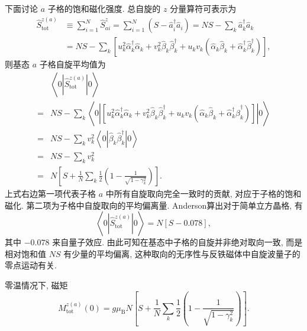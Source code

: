 下面讨论 $a$ 子格的饱和磁化强度. 总自旋的 $z$ 分量算符可表示为
\begin{align}
\hat{S}_\mathrm{tot}^{z(a)} & \equiv \sum_{i=1}^{N} \hat{S}_{a i}^{z}=\sum_{i=1}^{N}\left(S-\hat a_{i}^{\dagger} \hat a^{}_{i}\right)=N S-\sum_{k} \hat a_{k}^{\dagger} \hat a^{}_{k}\nonumber \\
&=NS-\sum_{k}\left[u_{k}^{2} \hat \alpha_{k}^{\dagger} \hat \alpha^{}_{k}+v_{k}^{2} \hat \beta^{}_{k} \hat \beta_{k}^{\dagger}+u_{k} v_{k}\left(\hat \alpha_{k} \hat \beta_{k}+\hat \alpha_{k}^{\dagger} \hat \beta_{k}^{\dagger}\right)\right],
\end{align}
则基态 $a$ 子格自旋平均值为
\begin{align}
&\left\langle0\left|\hat{S}_\mathrm{tot}^{z(a)} \right|0\right\rangle \nonumber\\
=&NS-\sum_{k}\left\langle0\left|\left[u_{k}^{2} \hat \alpha_{k}^{\dagger} \hat \alpha^{}_{k}+v_{k}^{2} \hat \beta^{}_{k} \hat \beta_{k}^{\dagger}+u_{k} v_{k}\left(\hat \alpha_{k} \hat \beta_{k}+\hat \alpha_{k}^{\dagger} \hat \beta_{k}^{\dagger}\right)\right] \right|0\right\rangle \nonumber\\
=&NS- \sum_{k} v_{k}^{2}\left\langle0\left|\hat \beta^{}_{k} \hat \beta_{k}^{\dagger}\right|0\right\rangle\nonumber \\
=&NS-\sum_{k} v_{k}^{2}\nonumber\\
=&N\left[S+\frac{1}{N}\sum_{k}\frac{1}{2}\left(1-\frac{1}{\sqrt{1-\gamma_{k}^{2}}}\right)\right].
\end{align}
上式右边第一项代表子格 $a$ 中所有自旋取向完全一致时的贡献, 对应于子格的饱和磁化. 第二项为子格中自旋取向的平均偏离量. Anderson算出对于简单立方晶格, 有
\begin{equation}
\left\langle0\left|\hat{S}_\mathrm{tot}^{z(a)} \right|0\right\rangle=N[S-0.078],
\end{equation}
其中 $-0.078$ 来自量子效应. 由此可知在基态中子格的自旋并非绝对取向一致, 而是相对饱和值 $N S$ 有少量的平均偏离, 这种取向的无序性与反铁磁体中自旋波量子的零点运动有关. 

零温情况下, 磁矩
\begin{equation}
M_{\mathrm{tot}}^{z(a)}(0) =g \mu_{\mathrm{B}} N\left[S+\frac{1}{N} \sum_{k} \frac{1}{2}\left(1-\frac{1}{\sqrt{1-\gamma_{k}^{2}}}\right)\right].
\end{equation}

